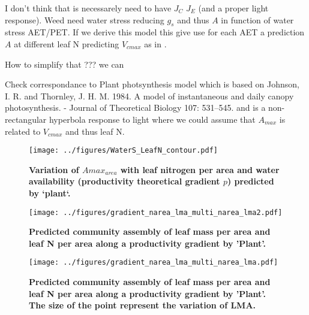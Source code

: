 \documentclass[a4paper,11pt]{article}
\begin{document}
I don't think that is necessarely need to have $J_C$ $J_E$ (and a
proper light response). Weed need water stress reducing $g_s$ and thus $A$ in function of water stress AET/PET. If we derive this model this give use for each AET a prediction $A$ at different leaf N predicting $V_{cmax}$ as in \citet{Sakschewski-2015}.

How to simplify that ??? we can


Check correspondance to Plant photsynthesis model which is based on Johnson, I. R. and Thornley, J. H. M. 1984. A model of instantaneous and daily canopy photosynthesis. - Journal of Theoretical Biology 107: 531–545.
 and is a non-rectangular hyperbola response to light where we could assume that $A_{max}$ is related to $V_{cmax}$ and thus leaf N.





\begin{figure}[ht]
\centering
\texttt{[image: ../figures/WaterS\_LeafN\_contour.pdf]}
\caption{\textbf{Variation of $A{max}_{area}$ with leaf nitrogen per area and water availability (productivity theoretical gradient $p$) predicted by `plant`.}
\label{fig:leafN_water}}
\end{figure}


\begin{figure}[ht]
\centering
\texttt{[image: ../figures/gradient\_narea\_lma\_multi\_narea\_lma2.pdf]}
\caption{\textbf{Predicted community assembly of leaf mass per area and leaf N per area along a productivity gradient by 'Plant'.}
\label{fig:lma_mat_o_map}}
\end{figure}

\begin{figure}[ht]
\centering
\texttt{[image: ../figures/gradient\_narea\_lma\_multi\_narea\_lma.pdf]}
\caption{\textbf{Predicted community assembly of leaf mass per area and leaf N per area along a productivity gradient by 'Plant'. The size of the point represent the variation of LMA.}
\label{fig:lma_mat_o_map}}
\end{figure}

\clearpage




\end{document}

